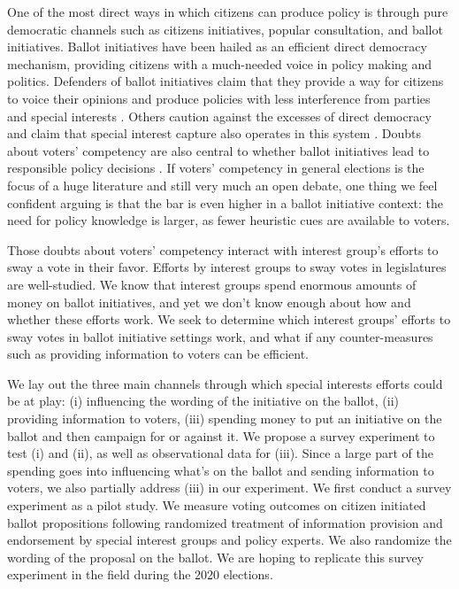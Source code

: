 \documentclass[12pt,final,fleqn]{article}
\theoremstyle{plain}
\begin{document}
One of the most direct ways in which citizens can produce policy is through pure democratic channels such as citizens initiatives, popular consultation, and ballot initiatives. Ballot initiatives have been hailed as an efficient direct democracy mechanism, providing citizens with a much-needed voice in policy making and politics. Defenders of ballot initiatives claim that they provide a way for citizens to voice their opinions and produce policies with less interference from parties and special interests \citep{cronin1999direct}. Others caution against the excesses of direct democracy and claim that special interest capture also operates in this system \citep{rosenbluth2018responsible}. Doubts about voters' competency are also central to whether ballot initiatives lead to responsible policy decisions \citep{achen2017democracy}. If voters' competency in general elections is the focus of a huge literature and still very much an open debate, one thing we feel confident arguing is that the bar is even higher in a ballot initiative context: the need for policy knowledge is larger, as fewer heuristic cues are available to voters.  

Those doubts about voters' competency interact with interest group's efforts to sway a vote in their favor. Efforts by interest groups to sway votes in legislatures are well-studied. We know that interest groups spend enormous amounts of money on ballot initiatives, and yet we don't know enough about how and whether these efforts work. We seek to determine which interest groups' efforts to sway votes in ballot initiative settings work, and what if any counter-measures such as providing information to voters can be efficient. 

We lay out the three main channels through which special interests efforts could be at play: (i) influencing the wording of the initiative on the ballot, (ii) providing information to voters, (iii) spending money to put an initiative on the ballot and then campaign for or against it. We propose a survey experiment to test (i) and (ii), as well as observational data for (iii). Since a large part of the spending goes into influencing what's on the ballot and sending information to voters, we also partially address (iii) in our experiment. We first conduct a survey experiment as a pilot study. We measure voting outcomes on citizen initiated ballot propositions following randomized treatment of information provision and endorsement by special interest groups and policy experts. We also randomize the wording of the proposal on the ballot. We are hoping to replicate this survey experiment in the field during the 2020 elections. 
\end{document}
